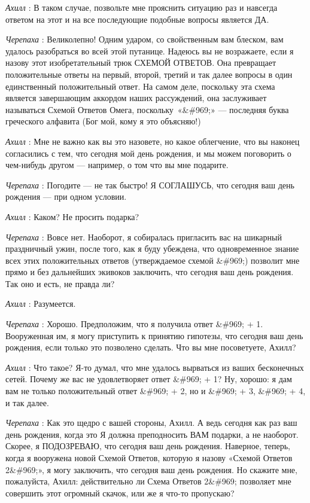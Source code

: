 \emph{Ахилл} : В таком случае, позвольте мне прояснить ситуацию раз и навсегда ответом на этот и на все последующие подобные вопросы является ДА.

\emph{Черепаха} : Великолепно! Одним ударом, со свойственным вам блеском, вам удалось разобраться во всей этой путанице. Надеюсь вы не возражаете, если я назову этот изобретательный трюк СХЕМОЙ ОТВЕТОВ. Она превращает положительные ответы на первый, второй, третий и так далее вопросы в один единственный положительный ответ. На самом деле, поскольку эта схема является завершающим аккордом наших рассуждений, она заслуживает называться Схемой Ответов Омега, поскольку~«\&\#969;» --- последняя буква греческого алфавита (Бог мой, кому я это объясняю!)

\emph{Ахилл} : Мне не важно как вы это назовете, но какое облегчение, что вы наконец согласились с тем, что сегодня мой день рождения, и мы можем поговорить о чем-нибудь другом --- например, о том что вы мне подарите.

\emph{Черепаха} : Погодите --- не так быстро! Я СОГЛАШУСЬ, что сегодня ваш день рождения --- при одном условии.

\emph{Ахилл} : Каком? Не просить подарка?

\emph{Черепаха} : Вовсе нет. Наоборот, я собиралась пригласить вас на шикарный праздничный ужин, после того, как я буду убеждена, что одновременное знание всех этих положительных ответов (утверждаемое схемой \&\#969;) позволит мне прямо и без дальнейших экивоков заключить, что сегодня ваш день рождения. Так оно и есть, не правда ли?

\emph{Ахилл} : Разумеется.

\emph{Черепаха} : Хорошо. Предположим, что я получила ответ \&\#969; + 1. Вооруженная им, я могу приступить к принятию гипотезы, что сегодня ваш день рождения, если только это позволено сделать. Что вы мне посоветуете, Ахилл?

\emph{Ахилл} : Что такое? Я-то думал, что мне удалось вырваться из ваших бесконечных сетей. Почему же вас не удовлетворяет ответ \&\#969; + 1? Ну, хорошо: я дам вам не только положительный ответ \&\#969; + 2, но и \&\#969; + 3, \&\#969; + 4, и так далее.

\emph{Черепаха} : Как это щедро с вашей стороны, Ахилл. А ведь сегодня как раз ваш день рождения, когда это Я должна преподносить ВАМ подарки, а не наоборот. Скорее, я ПОДОЗРЕВАЮ, что сегодня ваш день рождения. Наверное, теперь, когда я вооружена новой Схемой Ответов, которую я назову «Схемой Ответов 2\&\#969;», я могу заключить, что сегодня ваш день рождения. Но скажите мне, пожалуйста, Ахилл: действительно ли Схема Ответов 2\&\#969; позволяет мне совершить этот огромный скачок, или же я что-то пропускаю?

